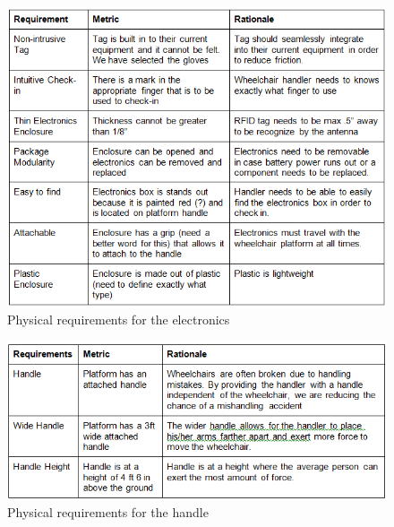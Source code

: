 \begin{figure}[h!]
  \centering
     \includegraphics[scale=1]{images/physical_requirements_electronics.png}
   \caption{Physical requirements for the electronics}
  \label{fig:phy_req_electronics}
\end{figure}

\newpage

\begin{figure}[h!]
  \centering
     \includegraphics[scale=1]{images/physical_requirements_handle.png}
   \caption{Physical requirements for the handle}
  \label{fig:phy_req_handle}
\end{figure}

\newpage

